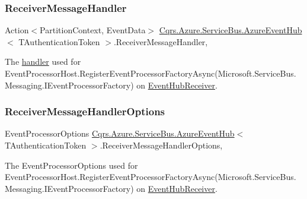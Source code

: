 \subsubsection{\texorpdfstring{Receiver\+Message\+Handler}{ReceiverMessageHandler}}
{\footnotesize\ttfamily Action$<$Partition\+Context, Event\+Data$>$ \hyperlink{classCqrs_1_1Azure_1_1ServiceBus_1_1AzureEventHub}{Cqrs.\+Azure.\+Service\+Bus.\+Azure\+Event\+Hub}$<$ T\+Authentication\+Token $>$.Receiver\+Message\+Handler\hspace{0.3cm}{\ttfamily [get]}, {\ttfamily [protected]}}



The \hyperlink{}{handler} used for Event\+Processor\+Host.\+Register\+Event\+Processor\+Factory\+Async(\+Microsoft.\+Service\+Bus.\+Messaging.\+I\+Event\+Processor\+Factory) on \hyperlink{classCqrs_1_1Azure_1_1ServiceBus_1_1AzureEventHub_a1b12b47dbb9b9afe2014477a2e457c35_a1b12b47dbb9b9afe2014477a2e457c35}{Event\+Hub\+Receiver}. 

\mbox{\label{classCqrs_1_1Azure_1_1ServiceBus_1_1AzureEventHub_ad3a0c2f32d5771fb1f4420fc33c75968_ad3a0c2f32d5771fb1f4420fc33c75968}} 
\subsubsection{\texorpdfstring{Receiver\+Message\+Handler\+Options}{ReceiverMessageHandlerOptions}}
{\footnotesize\ttfamily Event\+Processor\+Options \hyperlink{classCqrs_1_1Azure_1_1ServiceBus_1_1AzureEventHub}{Cqrs.\+Azure.\+Service\+Bus.\+Azure\+Event\+Hub}$<$ T\+Authentication\+Token $>$.Receiver\+Message\+Handler\+Options\hspace{0.3cm}{\ttfamily [get]}, {\ttfamily [protected]}}



The Event\+Processor\+Options used for Event\+Processor\+Host.\+Register\+Event\+Processor\+Factory\+Async(\+Microsoft.\+Service\+Bus.\+Messaging.\+I\+Event\+Processor\+Factory) on \hyperlink{classCqrs_1_1Azure_1_1ServiceBus_1_1AzureEventHub_a1b12b47dbb9b9afe2014477a2e457c35_a1b12b47dbb9b9afe2014477a2e457c35}{Event\+Hub\+Receiver}. 

